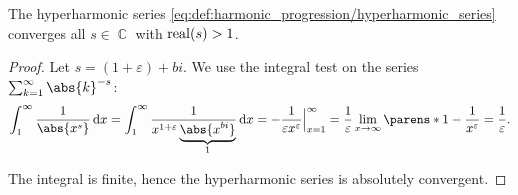\begin{proposition}\label{thm:hyperharmonic_series_convergence}
  The hyperharmonic series \eqref{eq:def:harmonic_progression/hyperharmonic_series} converges all \( s \in \BbbC \) with \( \operatorname{real}(s) > 1 \).
\end{proposition}
\begin{proof}
  Let \( s = (1 + \varepsilon) + bi \). We use the integral test on the series \( \sum_{k=1}^\infty \abs{k}^{-s} \):
  \begin{equation*}
    \int_1^\infty \frac 1 {\abs{x^s}} \dl x
    =
    \int_1^\infty \frac 1 {x^{1 + \varepsilon} \underbrace{\abs{x^{bi}}}_{1}} \dl x
    =
    -\frac 1 {\varepsilon x^\varepsilon}\Big\restr_{x=1}^\infty
    =
    \frac 1 \varepsilon \lim_{x \to \infty} \parens*{ 1 - \frac 1 {x^\varepsilon} }
    =
    \frac 1 \varepsilon.
  \end{equation*}

  The integral is finite, hence the hyperharmonic series is absolutely convergent.
\end{proof}
